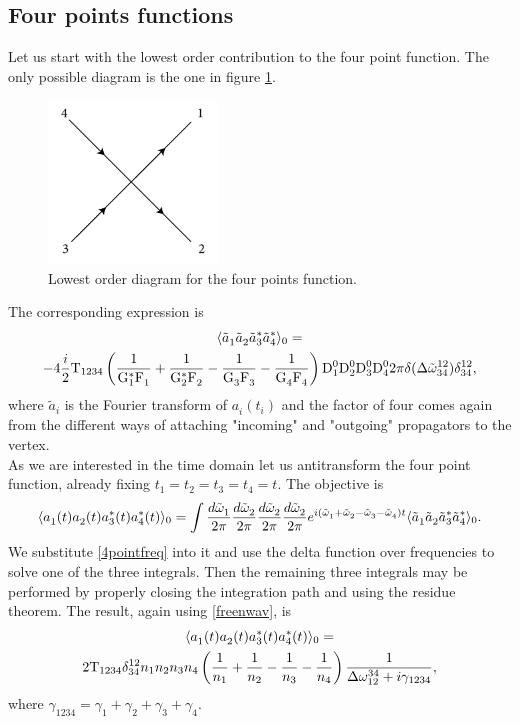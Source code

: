 \subsection{Four points functions}

Let us start with the lowest order contribution to the four point function. The only possible diagram is the one in figure \ref{fig:treefourpoints}.
\begin{figure}[ht]
    \centering
    \includegraphics[width=0.4\textwidth]{images/quarticvertex.jpg}
    \caption{Lowest order diagram for the four points function.}
    \label{fig:treefourpoints}
\end{figure}
The corresponding expression is
\begin{multline}
    \langle \tilde{a}_1^{} \tilde{a}_2^{} \tilde{a}_3^{*}\tilde{a}_4^{*} \rangle_{0} =\\
     -4\frac{i}{2} \mathrm{T}_{1234}\left(\dfrac{1}{\mathrm{G}_1^*\mathrm{F}_1^{}}+\dfrac{1}{\mathrm{G}_2^*\mathrm{F}_2^{}}-\dfrac{1}{\mathrm{G}_3^{}\mathrm{F}_3^{}}
    -\dfrac{1}{\mathrm{G}_4^{}\mathrm{F}_4^{}}\right)\mathrm{D}_1^0\mathrm{D}_2^0\mathrm{D}_3^0\mathrm{D}_4^0 2\pi \delta(\Delta{\tilde{\omega}}^{12}_{34})\delta^{12}_{34},
    \label{4pointfreq}
\end{multline}
where $\tilde{a}_i^{}$ is the Fourier transform of $a_i^{}(t_i)$ and the factor of four comes again from the different ways of attaching "incoming" and "outgoing" 
propagators to the vertex.\\
As we are interested in the time domain let us antitransform the four point function, already fixing $t_1 = t_2 = t_3 = t_4 = t$. The objective is
\begin{equation}
    \langle a_1^{}(t) a_2^{}(t) a_3^*(t) a_4^*(t) \rangle_0 = \int \frac{d\tilde{\omega}^{}_1}{2\pi}\frac{d\tilde{\omega}^{}_2}{2\pi}\frac{d\tilde{\omega}^{}_2}{2\pi}\frac{d\tilde{\omega}^{}_2}{2\pi}
    e^{i(\tilde{\omega}^{}_1 + \tilde{\omega}^{}_2  -\tilde{\omega}^{}_3 - \tilde{\omega}^{}_4)t} \langle \tilde{a}_1^{} \tilde{a}_2^{} \tilde{a}_3^{*}\tilde{a}_4^{*} \rangle_{0}.
    \label{antitransform4}
\end{equation}
We substitute \eqref{4pointfreq} into it and use the delta function over frequencies to solve one of the three integrals. Then the remaining three integrals may 
be performed by properly closing the integration path and using the residue theorem. The result, again using \eqref{freenwav}, is
\begin{multline}
    \langle a_1^{}(t) a_2^{}(t) a_3^*(t) a_4^*(t) \rangle_0 = \\
    2\mathrm{T}_{1234}\delta^{12}_{34}n_1 n_2 n_3 n_4\left( \frac{1}{n_1}+\frac{1}{n_2}-\frac{1}{n_3}-\frac{1}{n_4} \right)
    \frac{1}{\Delta{\omega}^{34}_{12} + i\gamma_{1234}},
    \label{fourpointtree}
\end{multline}  
where $\gamma_{1234} = \gamma_1 + \gamma_2 + \gamma_3 + \gamma_4$. \\

